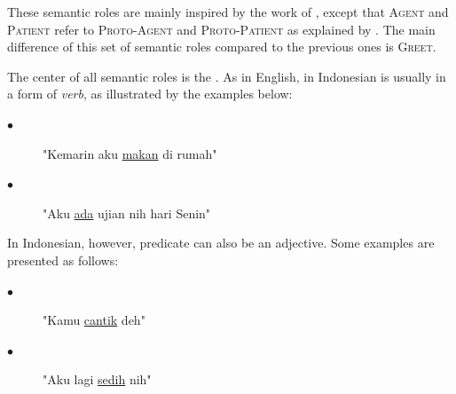 These semantic roles are mainly inspired by the work of \cite{saeed19972003}, except that \textsc{Agent} and \textsc{Patient} refer to \textsc{Proto-Agent} and \textsc{Proto-Patient} as explained by \cite{dowty1991thematic}. The main difference of this set of semantic roles compared to the previous ones is \textsc{Greet}.

The center of all semantic roles is the \predicate. As in English, \predicate in Indonesian is usually in a form of \textit{verb}, as illustrated by the examples below:
\begin{description}
	\item[$\bullet$] "Kemarin aku \underline{makan} di rumah"
	\item[$\bullet$] "Aku \underline{ada} ujian nih hari Senin"
\end{description}

In Indonesian, however, predicate can also be an adjective. Some examples are presented as follows:
\begin{description}
	\item[$\bullet$] "Kamu \underline{cantik} deh"
	\item[$\bullet$] "Aku lagi \underline{sedih} nih"
\end{description}

